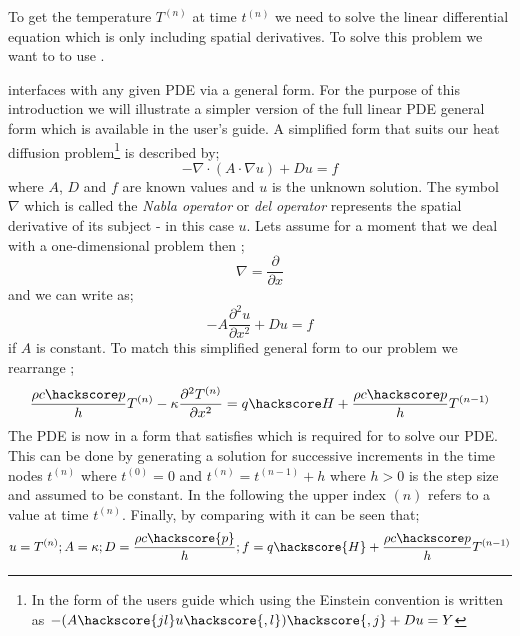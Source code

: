 To get the temperature $T^{(n)}$ at time $t^{(n)}$ we need to solve the linear 
differential equation  which is only including spatial derivatives. To solve this problem
we want to to use \esc. 

\esc interfaces with any given PDE via a general form. For the purpose of this introduction we will illustrate a simpler version of the full linear PDE general form which is available in the \esc user's guide. A simplified form that suits our heat diffusion problem\footnote{In the form of the \esc users guide which using the Einstein convention is written as 
$-(A\hackscore{jl} u\hackscore{,l})\hackscore{,j}+D u =Y$}
is described by;
\begin{equation}\label{eqn:commonform nabla}
-\nabla\cdot(A\cdot\nabla u) + Du = f
\end{equation}
where $A$, $D$ and $f$ are known values and $u$ is the unknown solution. The symbol $\nabla$ which is called the \textit{Nabla operator} or \textit{del operator} represents
the spatial derivative of its subject - in this case $u$. Lets assume for a moment that we deal with a one-dimensional problem then ;
\begin{equation}
\nabla = \frac{\partial}{\partial x}
\end{equation}
and we can write  as;
\begin{equation}\label{eqn:commonform}
-A\frac{\partial^{2}u}{\partial x^{2}} + Du = f
\end{equation}
if $A$ is constant. To match this simplified general form to our problem  
we rearrange ;
\begin{equation}
\frac{\rho c\hackscore p}{h} T^{(n)} - \kappa \frac{\partial^2 T^{(n)}}{\partial x^2} = q\hackscore H +  \frac{\rho c\hackscore p}{h} T^{(n-1)}
\label{eqn:hdgenf}
\end{equation}
The PDE is now in a form that satisfies  which is required for \esc to solve our PDE. This can be done by generating a solution for successive increments in the time nodes $t^{(n)}$ where 
$t^{(0)}=0$ and  $t^{(n)}=t^{(n-1)}+h$ where $h>0$ is the step size and assumed to be constant. 
In the following the upper index ${(n)}$ refers to a value at time $t^{(n)}$. Finally, by comparing  with  it can be seen that;
\begin{equation}
u=T^{(n)}; 
A = \kappa; D = \frac{\rho c \hackscore{p}}{h}; f = q \hackscore{H} + \frac{\rho c\hackscore p}{h} T^{(n-1)}
\end{equation}

